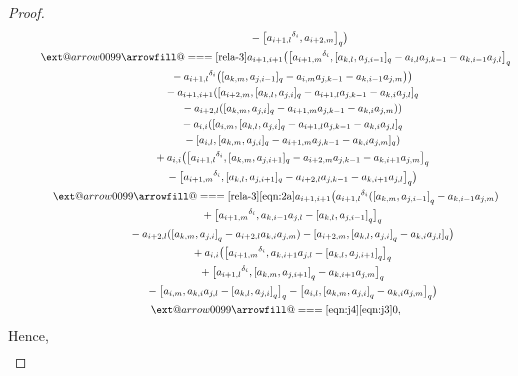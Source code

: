 \documentclass[10pt,a4paper]{amsart}
\makeatletter
\def\x@arrow{\DOTSB\Relbar}
\def\xlongequalsignfill@{\arrowfill@\x@arrow\Relbar\x@arrow}
\providecommand{\xlongequal}[2][]{%
	\ext@arrow 0099\xlongequalsignfill@{#1}{#2}}
\numberwithin{equation}{section}
\def\lr#1{\left[#1\right]}
\def\d{\delta}
\makeatother
\begin{document}
\begin{proof}
\begin{gather*}
\quad\qquad\qquad\qquad\ {}- \bigl[{a_{i+1,l}}^{\d_i},a_{i+2,m} \bigr]_q \bigr)\\
\quad\qquad \xlongequal{\eqref{rela-3}} a_{i+1,i+1} \bigl( \bigl[{a_{i+1,m}}^{\d_i}, [a_{k,l},a_{j,i-1} ]_q -a_{i,l}a_{j,k-1}-a_{k,i-1}a_{j,l} \bigr]_q \\
\quad\qquad\qquad \quad {}-{a_{i+1,l}}^{\d_i} \bigl( [a_{k,m},a_{j,i-1} ]_q-a_{i,m}a_{j,k-1} -a_{k,i-1}a_{j,m} \bigr) \bigr)\\
 \quad\qquad\qquad \quad {}-a_{i+1,i+1} ( [a_{i+2,m}, [a_{k,l},a_{j,i} ]_q-a_{i+1,l}a_{j,k-1} -a_{k,i}a_{j,l} ]_q \\
 \quad\qquad\qquad\quad {}-a_{i+2,l} ( [a_{k,m},a_{j,i} ]_q-a_{i+1,m}a_{j,k-1} -a_{k,i}a_{j,m} ) )\\
 \quad\qquad\qquad\quad {}-a_{i,i} ( [a_{i,m}, [a_{k,l},a_{j,i} ]_q -a_{i+1,l}a_{j,k-1}-a_{k,i}a_{j,l} ]_q \\
\quad\qquad\qquad \quad {}- [a_{i,l}, [a_{k,m},a_{j,i} ]_q-a_{i+1,m}a_{j,k-1} -a_{k,i}a_{j,m} ]_q )\\
\quad\qquad\qquad\quad {}+a_{i,i} \bigl( \bigl[{a_{i+1,l}}^{\d_i}, [a_{k,m},a_{j,i+1} ]_q -a_{i+2,m}a_{j,k-1}-a_{k,i+1}a_{j,m} \bigr]_q \\
\quad\qquad\qquad \quad {}- \bigl[{a_{i+1,m}}^{\d_i}, [a_{k,l},a_{j,i+1} ]_q -a_{i+2,l}a_{j,k-1}-a_{k,i+1}a_{j,l} \bigr]_q \bigr)\\
\quad\qquad \xlongequal[\eqref{rela-3}]{\eqref{eqn:2a}} a_{i+1,i+1} \bigl({a_{i+1,l}}^{\d_i} (\lr{a_{k,m},a_{j,i-1}}_q-a_{k,i-1}a_{j,m}) \\
 \quad\qquad\qquad \quad {}+\bigl[{a_{i+1,m}}^{\d_i}, a_{k,i-1}a_{j,l}-\lr{a_{k,l},a_{j,i-1}}_q\bigr]_q \\
 \quad\qquad\qquad \quad {}-a_{i+2,l}(\lr{a_{k,m}, a_{j,i}}_q -a_{i+2,l}a_{k,i}a_{j,m})-[a_{i+2,m}, \lr{a_{k,l},a_{j,i}}_q-a_{k,i}a_{j,l}]_q \bigr)\\
 \quad\qquad\qquad \quad {}+a_{i,i} \bigl(\bigl[{a_{i+1,m}}^{\d_i},a_{k,i+1}a_{j,l}-\lr{a_{k,l},a_{j,i+1}}_q\bigr]_q \\
 \quad\qquad\qquad \quad {}+\bigl[{a_{i+1,l}}^{\d_i},\lr{a_{k,m},a_{j,i+1}}_q-a_{k,i+1}a_{j,m}\bigr]_q \\
 \quad\qquad\qquad \quad {}-\bigl[a_{i,m},a_{k,i}a_{j,l} -\lr{a_{k,l},a_{j,i}}_q\bigr]_q -\bigl[a_{i,l},\lr{a_{k,m},a_{j,i}}_q-a_{k,i}a_{j,m}\bigr]_q \bigr)\\
\quad\qquad \xlongequal[\eqref{eqn:j4}]{\eqref{eqn:j3}} 0,
\end{gather*}
Hence,
\begin{gather*}

\end{gather*}
\end{proof}
\end{document}
